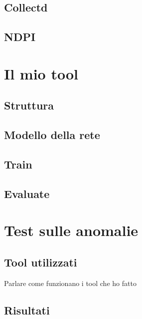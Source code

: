 \subsection{Collectd}
\subsection{NDPI}

\section{Il mio tool}
\subsection{Struttura}
\subsection{Modello della rete}
\subsection{Train}
\subsection{Evaluate}


\section{Test sulle anomalie}
\subsection{Tool utilizzati}

Parlare come funzionano i tool che ho fatto

\subsection{Risultati}
